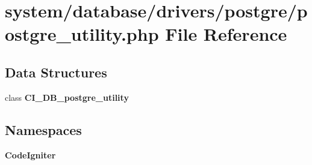 \section{system/database/drivers/postgre/postgre\-\_\-utility.php File Reference}
\label{postgre__utility_8php}
\subsection*{Data Structures}
\begin{DoxyCompactItemize}
\item 
class {\bf C\-I\-\_\-\-D\-B\-\_\-postgre\-\_\-utility}
\end{DoxyCompactItemize}
\subsection*{Namespaces}
\begin{DoxyCompactItemize}
\item 
{\bf Code\-Igniter}
\end{DoxyCompactItemize}
